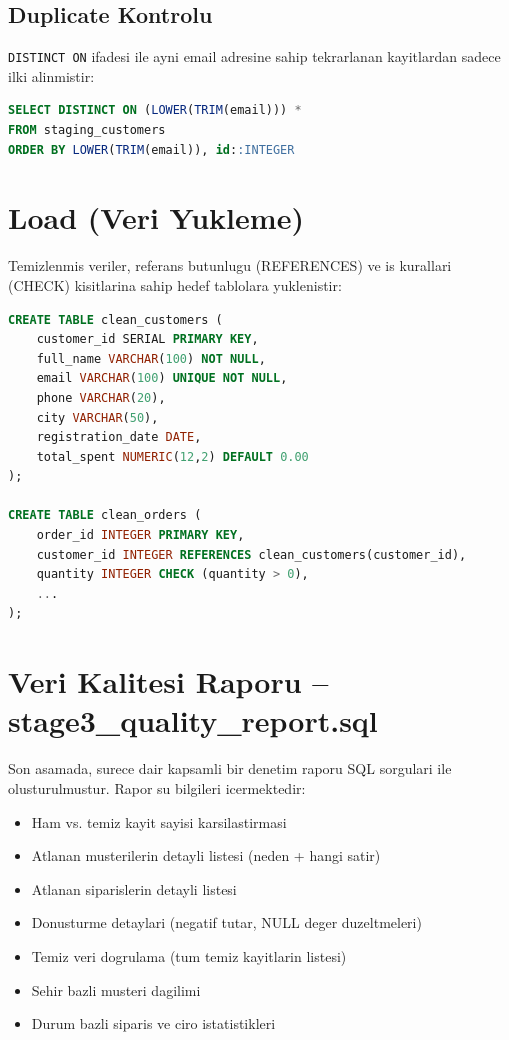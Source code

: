 \documentclass[12pt,a4paper]{article}
\begin{document}
\subsection{Duplicate Kontrolu}
\texttt{DISTINCT ON} ifadesi ile ayni email adresine sahip tekrarlanan kayitlardan sadece ilki alinmistir:
\begin{lstlisting}[language=SQL, caption=Duplicate Eleme]
SELECT DISTINCT ON (LOWER(TRIM(email))) *
FROM staging_customers
ORDER BY LOWER(TRIM(email)), id::INTEGER
\end{lstlisting}

\section{Load (Veri Yukleme)}
Temizlenmis veriler, referans butunlugu (REFERENCES) ve is kurallari (CHECK) kisitlarina sahip hedef tablolara yuklenistir:
\begin{lstlisting}[language=SQL, caption=Hedef Tablo Semalari]
CREATE TABLE clean_customers (
    customer_id SERIAL PRIMARY KEY,
    full_name VARCHAR(100) NOT NULL,
    email VARCHAR(100) UNIQUE NOT NULL,
    phone VARCHAR(20),
    city VARCHAR(50),
    registration_date DATE,
    total_spent NUMERIC(12,2) DEFAULT 0.00
);

CREATE TABLE clean_orders (
    order_id INTEGER PRIMARY KEY,
    customer_id INTEGER REFERENCES clean_customers(customer_id),
    quantity INTEGER CHECK (quantity > 0),
    ...
);
\end{lstlisting}

\section{Veri Kalitesi Raporu -- stage3\_quality\_report.sql}
Son asamada, surece dair kapsamli bir denetim raporu SQL sorgulari ile olusturulmustur. Rapor su bilgileri icermektedir:

\begin{itemize}
    \item Ham vs. temiz kayit sayisi karsilastirmasi
    \item Atlanan musterilerin detayli listesi (neden + hangi satir)
    \item Atlanan siparislerin detayli listesi
    \item Donusturme detaylari (negatif tutar, NULL deger duzeltmeleri)
    \item Temiz veri dogrulama (tum temiz kayitlarin listesi)
    \item Sehir bazli musteri dagilimi
    \item Durum bazli siparis ve ciro istatistikleri
\end{itemize}
\end{document}
